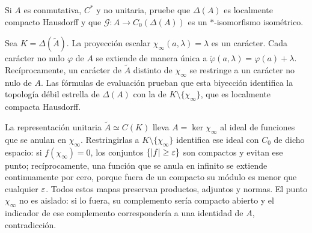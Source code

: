 \begin{ejercicio}\label{ej:v3-l26-2}
Si $A$ es conmutativa, $C^*$ y no unitaria, pruebe que $\Delta(A)$ es localmente compacto Hausdorff y que $\mathcal G:A\to C_0(\Delta(A))$ es un $*$-isomorfismo isométrico.
\end{ejercicio}
\begin{solucion}
Sea $K=\Delta(\widetilde A)$. La proyección escalar $\chi_\infty(a,\lambda)=\lambda$ es un carácter. Cada carácter no nulo $\varphi$ de $A$ se extiende de manera única a $\widetilde\varphi(a,\lambda)=\varphi(a)+\lambda$. Recíprocamente, un carácter de $\widetilde A$ distinto de $\chi_\infty$ se restringe a un carácter no nulo de $A$. Las fórmulas de evaluación prueban que esta biyección identifica la topología débil estrella de $\Delta(A)$ con la de $K\setminus\{\chi_\infty\}$, que es localmente compacta Hausdorff.

La representación unitaria $\widetilde A\simeq C(K)$ lleva $A=\ker\chi_\infty$ al ideal de funciones que se anulan en $\chi_\infty$. Restringirlas a $K\setminus\{\chi_\infty\}$ identifica ese ideal con $C_0$ de dicho espacio: si $f(\chi_\infty)=0$, los conjuntos $\{|f|\ge\varepsilon\}$ son compactos y evitan ese punto; recíprocamente, una función que se anula en infinito se extiende continuamente por cero, porque fuera de un compacto su módulo es menor que cualquier $\varepsilon$. Todos estos mapas preservan productos, adjuntos y normas. El punto $\chi_\infty$ no es aislado: si lo fuera, su complemento sería compacto abierto y el indicador de ese complemento correspondería a una identidad de $A$, contradicción.
\end{solucion}

